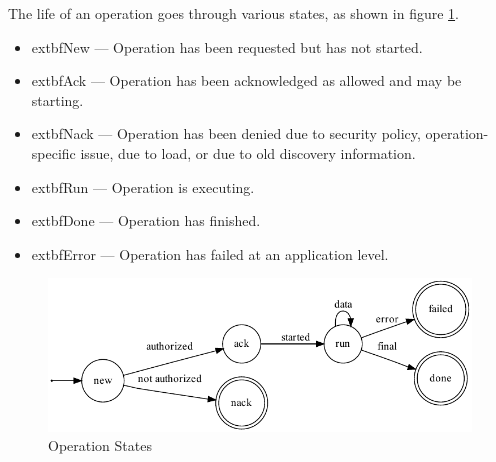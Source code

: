 The life of an operation goes through various states, as shown in figure \ref{fig:op-states}.

\begin{itemize}
        \item         extbf{New} --- Operation has been requested but has not started.
        \item         extbf{Ack} --- Operation has been acknowledged as allowed and may be starting.
        \item         extbf{Nack} --- Operation has been denied due to security policy, operation-specific issue, due to load, or due to old discovery information.
        \item         extbf{Run} --- Operation is executing.
        \item         extbf{Done} --- Operation has finished.
        \item         extbf{Error} --- Operation has failed at an application level.
\end{itemize}

\begin{figure}
        \begin{center}\includegraphics[width=\myfigwidth,height=\myfigheight,keepaspectratio]{figs/dot/op_states}\end{center}
        \caption{Operation States}
        \label{fig:op-states}
\end{figure}
